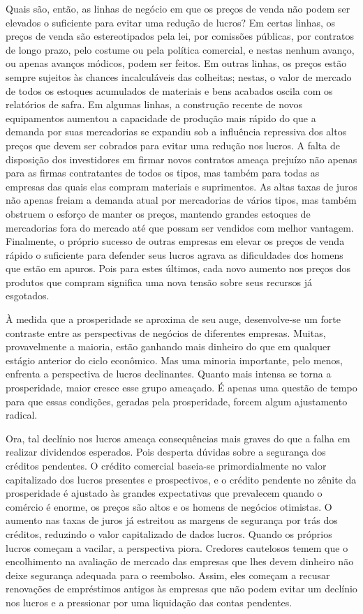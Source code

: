 \documentclass[12pt]{article}
\begin{document}
Quais são, então, as linhas de negócio em que os preços de venda não podem ser elevados o suficiente para evitar uma redução de lucros? Em certas linhas, os preços de venda são estereotipados pela lei, por comissões públicas, por contratos de longo prazo, pelo costume ou pela política comercial, e nestas nenhum avanço, ou apenas avanços módicos, podem ser feitos. Em outras linhas, os preços estão sempre sujeitos às chances incalculáveis das colheitas; nestas, o valor de mercado de todos os estoques acumulados de materiais e bens acabados oscila com os relatórios de safra. Em algumas linhas, a construção recente de novos equipamentos aumentou a capacidade de produção mais rápido do que a demanda por suas mercadorias se expandiu sob a influência repressiva dos altos preços que devem ser cobrados para evitar uma redução nos lucros. A falta de disposição dos investidores em firmar novos contratos ameaça prejuízo não apenas para as firmas contratantes de todos os tipos, mas também para todas as empresas das quais elas compram materiais e suprimentos. As altas taxas de juros não apenas freiam a demanda atual por mercadorias de vários tipos, mas também obstruem o esforço de manter os preços, mantendo grandes estoques de mercadorias fora do mercado até que possam ser vendidos com melhor vantagem. Finalmente, o próprio sucesso de outras empresas em elevar os preços de venda rápido o suficiente para defender seus lucros agrava as dificuldades dos homens que estão em apuros. Pois para estes últimos, cada novo aumento nos preços dos produtos que compram significa uma nova tensão sobre seus recursos já esgotados.

À medida que a prosperidade se aproxima de seu auge, desenvolve-se um forte contraste entre as perspectivas de negócios de diferentes empresas. Muitas, provavelmente a maioria, estão ganhando mais dinheiro do que em qualquer estágio anterior do ciclo econômico. Mas uma minoria importante, pelo menos, enfrenta a perspectiva de lucros declinantes. Quanto mais intensa se torna a prosperidade, maior cresce esse grupo ameaçado. É apenas uma questão de tempo para que essas condições, geradas pela prosperidade, forcem algum ajustamento radical.

Ora, tal declínio nos lucros ameaça consequências mais graves do que a falha em realizar dividendos esperados. Pois desperta dúvidas sobre a segurança dos créditos pendentes. O crédito comercial baseia-se primordialmente no valor capitalizado dos lucros presentes e prospectivos, e o crédito pendente no zênite da prosperidade é ajustado às grandes expectativas que prevalecem quando o comércio é enorme, os preços são altos e os homens de negócios otimistas. O aumento nas taxas de juros já estreitou as margens de segurança por trás dos créditos, reduzindo o valor capitalizado de dados lucros. Quando os próprios lucros começam a vacilar, a perspectiva piora. Credores cautelosos temem que o encolhimento na avaliação de mercado das empresas que lhes devem dinheiro não deixe segurança adequada para o reembolso. Assim, eles começam a recusar renovações de empréstimos antigos às empresas que não podem evitar um declínio nos lucros e a pressionar por uma liquidação das contas pendentes.
\end{document}
